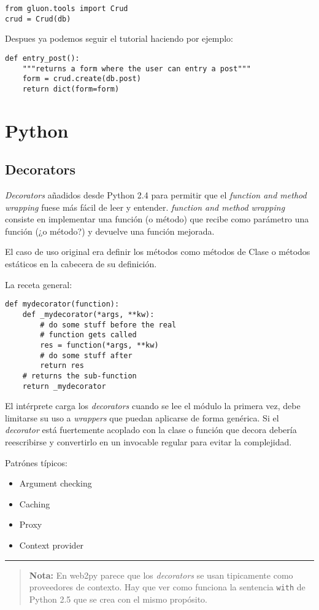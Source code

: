 \documentclass[12pt,spanish,]{article}
\providecommand{\tightlist}{%
  \setlength{\itemsep}{0pt}\setlength{\parskip}{0pt}}
\begin{document}
\begin{verbatim}
from gluon.tools import Crud
crud = Crud(db)
\end{verbatim}

Despues ya podemos seguir el tutorial haciendo por ejemplo:

\begin{verbatim}
def entry_post():
    """returns a form where the user can entry a post"""
    form = crud.create(db.post)
    return dict(form=form)
\end{verbatim}

\section{Python}\label{python}

\subsection{Decorators}\label{decorators}

\emph{Decorators} añadidos desde Python 2.4 para permitir que el
\emph{function and method wrapping} fuese más fácil de leer y entender.
\emph{function and method wrapping} consiste en implementar una función
(o método) que recibe como parámetro una función (¿o método?) y devuelve
una función mejorada.

El caso de uso original era definir los métodos como métodos de Clase o
métodos estáticos en la cabecera de su definición.

La receta general:

\begin{verbatim}
def mydecorator(function):
    def _mydecorator(*args, **kw):
        # do some stuff before the real 
        # function gets called 
        res = function(*args, **kw)
        # do some stuff after
        return res
    # returns the sub-function
    return _mydecorator
\end{verbatim}

El intérprete carga los \emph{decorators} cuando se lee el módulo la
primera vez, debe limitarse su uso a \emph{wrappers} que puedan
aplicarse de forma genérica. Si el \emph{decorator} está fuertemente
acoplado con la clase o función que decora debería reescribirse y
convertirlo en un invocable regular para evitar la complejidad.

Patrónes típicos:

\begin{itemize}
\tightlist
\item
  Argument checking
\item
  Caching
\item
  Proxy
\item
  Context provider
\end{itemize}

\begin{center}\rule{0.5\linewidth}{\linethickness}\end{center}

\begin{quote}
\textbf{Nota:} En web2py parece que los \emph{decorators} se usan
tipicamente como proveedores de contexto. Hay que ver como funciona la
sentencia \texttt{with} de Python 2.5 que se crea con el mismo
propósito.
\end{quote}
\end{document}
